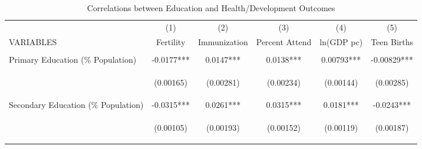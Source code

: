 \begin{landscape}\begin{table}[htpb!]\begin{center}\caption{Correlations between Education and Health/Development Outcomes}\label{MMRtab:Zscore}\begin{tabular}{lccccc}\toprule 
 &(1)&(2)&(3)&(4)&(5)\\VARIABLES&Fertility&Immunization&Percent Attend&ln(GDP pc)& Teen Births\\\midrule
 \vspace{4pt}&\begin{footnotesize}\end{footnotesize}&\begin{footnotesize}\end{footnotesize}&\begin{footnotesize}\end{footnotesize}&\begin{footnotesize}\end{footnotesize}&\begin{footnotesize}\end{footnotesize}\\Primary Education (\% Population) &-0.0177***&0.0147***&0.0138***&0.00793***&-0.00829***\\
&\begin{footnotesize}(0.00165)\end{footnotesize}&\begin{footnotesize}(0.00281)\end{footnotesize}&\begin{footnotesize}(0.00234)\end{footnotesize}&\begin{footnotesize}(0.00144)\end{footnotesize}&\begin{footnotesize}(0.00285)\end{footnotesize}\\
Secondary Education (\% Population) &-0.0315***&0.0261***&0.0315***&0.0181***&-0.0243***\\
&\begin{footnotesize}(0.00105)\end{footnotesize}&\begin{footnotesize}(0.00193)\end{footnotesize}&\begin{footnotesize}(0.00152)\end{footnotesize}&\begin{footnotesize}(0.00119)\end{footnotesize}&\begin{footnotesize}(0.00187)\end{footnotesize}\\

\end{tabular}
\end{center}
\end{table}
\end{landscape}

